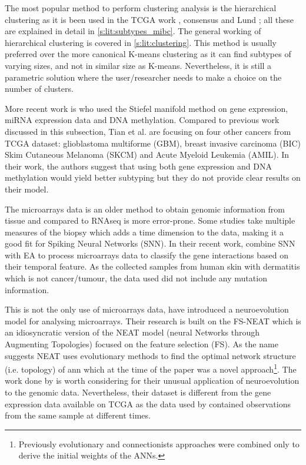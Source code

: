The most popular method to perform clustering analysis is the hierarchical clustering as it is been used in the TCGA work \cite{Robertson2017-mg}, consensus \citet{Kamoun2020-tj} and Lund \cite{Sjodahl2017-xr}; all these are explained in detail in \cref{s:lit:subtypes_mibc}. The general working of hierarchical clustering is covered in \cref{s:lit:clustering}. This method is usually preferred over the more canonical K-means clustering as it can find subtypes of varying sizes, and not in similar size as K-means. Nevertheless, it is still a parametric solution where the user/researcher needs to make a choice on the number of clusters.

More recent work is \citet{Tian2021-vu} who used the Stiefel manifold method on gene expression, miRNA expression data and DNA methylation. Compared to previous work discussed in this subsection, Tian et al. are focusing on four other cancers from TCGA dataset: glioblastoma multiforme (GBM), breast invasive carcinoma (BIC) Skim Cutaneous Melanoma (SKCM) and Acute Myeloid Leukemia (AMIL). In their work, the authors suggest that using both gene expression and DNA methylation would yield better subtyping but they do not provide clear results on their model.

The microarrays data is an older method to obtain genomic information from tissue and compared to RNAseq is more error-prone. Some studies take multiple measures of the biopsy which adds a time dimension to the data, making it a good fit for Spiking Neural Networks (SNN). In their recent work, \citet{Capecci2020-uj} combine SNN with EA to process microarrays data to classify the gene interactions based on their temporal feature. As the collected samples from human skin with dermatitis which is not cancer/tumour, the data used did not include any mutation information. 

This is not the only use of microarrays data, \citet{Grisci2019-xn} have introduced a neuroevolution model for analysing microarrays. Their research is built on the FS-NEAT\cite{Whiteson2005-dn} which is an idiosyncratic version of the NEAT model (neural Networks through Augmenting Topologies)\cite{Stanley2002-tg} focused on the feature selection (FS). As the name suggests NEAT\cite{Stanley2002-tg} uses evolutionary methods to find the optimal network structure (i.e. topology) of \acrshort{ann} which at the time of the paper was a novel approach\footnote{Previously evolutionary and connectionists approaches were combined only to derive the initial weights of the ANNs.}. The work done by \citet{Grisci2019-xn} is worth considering for their unusual application of neuroevolution to the genomic data. Nevertheless, their dataset is different from the gene expression data available on TCGA as the data used by \citet{Grisci2019-xn} contained observations from the same sample at different times.


